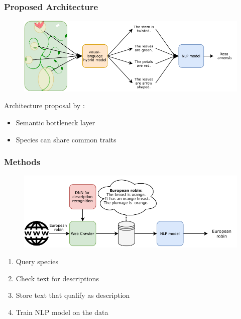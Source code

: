 \documentclass{beamer}
\begin{document}
\begin{frame}
\frametitle{Proposed Architecture}
\begin{figure} [htbp]
    \centering
    \includegraphics[width=\textwidth]{figures/architecture.pdf}
\end{figure}
Architecture proposal by \textcite{ishikawa_contextual_2021}:
\begin{itemize}
    \item Semantic bottleneck layer
    \item Species can share common traits
\end{itemize}
\end{frame}

\begin{frame}
\frametitle{Methods}
\begin{figure} [htbp]
    \centering
    \includegraphics[width=\textwidth]{figures/workflow.pdf}
\end{figure}
\begin{enumerate}
    \item Query species
    \item Check text for descriptions 
    \item Store text that qualify as description
    \item Train NLP model on the data
\end{enumerate}
\end{frame}
\end{document}
